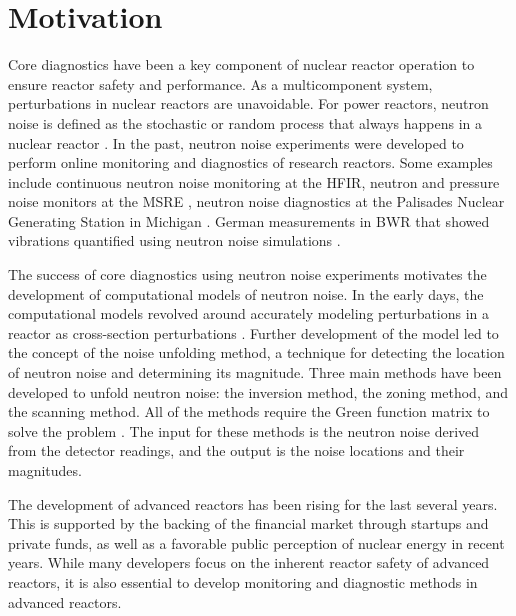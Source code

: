 \label{ch:introduction}

\section{Motivation}

Core diagnostics have been a key component of nuclear reactor operation to ensure reactor safety and performance. As a multicomponent system, perturbations in nuclear reactors are unavoidable. For power reactors, neutron noise is defined as the stochastic or random process that always happens in a nuclear reactor \cite{saitoTheoryPowerReactor1974b}. In the past, neutron noise experiments were developed to perform online monitoring and diagnostics of research reactors. Some examples include continuous neutron noise monitoring at the \gls*{HFIR}, neutron and pressure noise monitors at the \gls*{MSRE} \cite{fryExperienceReactorMalfunction1971}, neutron noise diagnostics at the Palisades Nuclear Generating Station in Michigan \cite{fryAnalysisNeutrondensityOscillations1975}. German measurements in \gls*{BWR} that showed vibrations quantified using neutron noise simulations \cite{wachInvestigationJointEffect1974}.

The success of core diagnostics using neutron noise experiments motivates the development of computational models of neutron noise. In the early days, the computational models revolved around accurately modeling perturbations in a reactor as cross-section perturbations \cite{saitoTheoryPowerReactor1974,saitoTheoryPowerReactor1974a}. Further development of the model led to the concept of the noise unfolding method, a technique for detecting the location of neutron noise and determining its magnitude. Three main methods have been developed to unfold neutron noise: the inversion method, the zoning method, and the scanning method. All of the methods require the Green function matrix to solve the problem \cite{pazsitNoiseTechniquesNuclear2010}. The input for these methods is the neutron noise derived from the detector readings, and the output is the noise locations and their magnitudes.

The development of advanced reactors has been rising for the last several years. This is supported by the backing of the financial market through startups and private funds, as well as a favorable public perception of nuclear energy in recent years. While many developers focus on the inherent reactor safety of advanced reactors, it is also essential to develop monitoring and diagnostic methods in advanced reactors.


